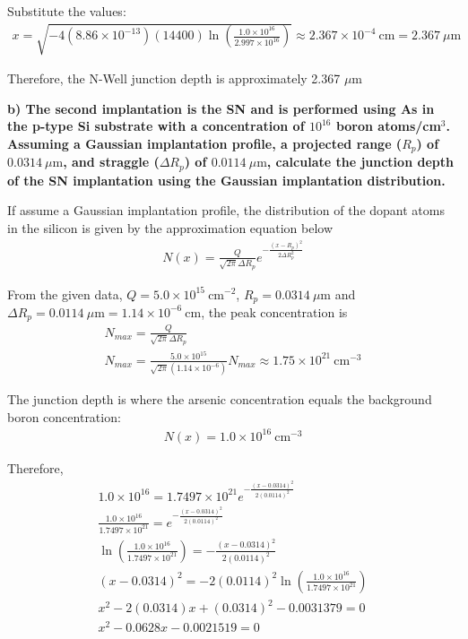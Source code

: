Substitute the values:
\begin{gather*}
    x = \sqrt{-4(8.86 \times 10^{-13})(14400)
    \ln \left(\frac{1.0 \times 10^{16}}{2.997 \times 10^{16}}\right)} \approx 2.367 \times 10^{-4} \ \mathrm{cm} = 2.367 \ \mu\mathrm{m}
\end{gather*}

Therefore, the N-Well junction depth is approximately 2.367 $\mu\mathrm{m}$


\vspace{0.5em}
\noindent \textbf{b) The second implantation is the SN and is performed using As in the p-type Si substrate with a concentration of $10^{16}$ boron atoms/cm$^3$. Assuming a Gaussian implantation profile, a projected range ($R_p$) of $0.0314 \ \mu\mathrm{m}$, and straggle ($\Delta R_p$) of $0.0114 \ \mu\mathrm{m}$, calculate the junction depth of the SN implantation using the Gaussian implantation distribution.}

If assume a Gaussian implantation profile, the distribution of the dopant atoms in the silicon is given by the approximation equation below
\begin{gather*}
    N(x)=\frac{Q}{\sqrt{2\pi}\Delta R_p}e^{-\frac{(x-R_p)^2}{2\Delta R_p^2}}
\end{gather*}

From the given data, $Q = 5.0 \times 10^{15} \ \mathrm{cm^{-2}}$, $R_p = 0.0314 \ \mu\mathrm{m}$ and $\Delta R_p = 0.0114 \ \mu\mathrm{m} = 1.14 \times 10^{-6} \ \mathrm{cm}$, the peak concentration is
\begin{gather*}
    N_{max}=\frac{Q}{\sqrt{2\pi}\Delta R_p} \\
    N_{max}=\frac{5.0 \times 10^{15}}{\sqrt{2\pi}(1.14 \times 10^{-6})}  N_{max} \approx 1.75 \times 10^{21} \ \mathrm{cm^{-3}}
\end{gather*}

The junction depth is where the arsenic concentration equals the background boron concentration:
\begin{gather*}
    N(x)=1.0 \times 10^{16} \ \mathrm{cm^{-3}}
\end{gather*}

Therefore,
\begin{gather*}
    1.0 \times 10^{16} = 1.7497 \times 10^{21}e^{-\frac{(x-0.0314)^2}{2(0.0114)^2}} \\
    \frac{1.0 \times 10^{16}}{1.7497 \times 10^{21}} = e^{-\frac{(x-0.0314)^2}{2(0.0114)^2}} \\
    \ln\left(\frac{1.0 \times 10^{16}}{1.7497 \times 10^{21}}\right) = -\frac{(x-0.0314)^2}{2(0.0114)^2} \\
    (x-0.0314)^2 = -2(0.0114)^2
    \ln\left(\frac{1.0 \times 10^{16}}{1.7497 \times 10^{21}}\right) \\
    x^2 - 2(0.0314)x + (0.0314)^2 - 0.0031379 = 0 \\
    x^2 - 0.0628x - 0.0021519 = 0
\end{gather*}


